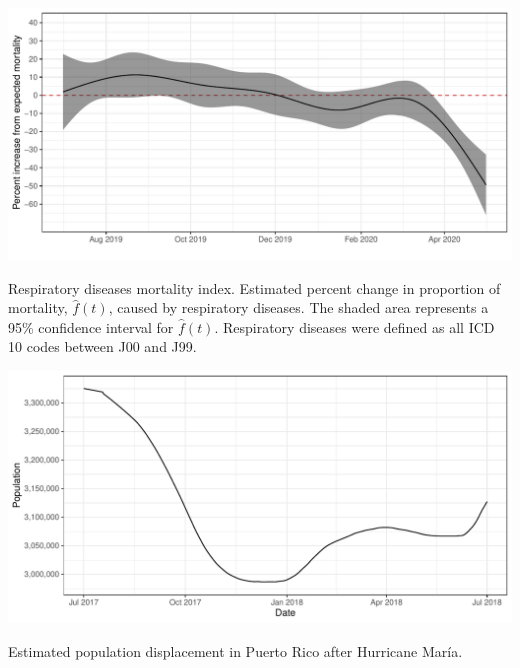 \documentclass[11pt]{article}
\begin{document}
\begin{suppfigure}[ht]
	\centering
	\includegraphics[width=1\linewidth]{figs/supp-figure-6.pdf} 
	\caption{Respiratory diseases mortality index. Estimated percent change in proportion of mortality, $\hat{f}(t)$, caused by respiratory diseases. The shaded area represents a 95\% confidence interval for $\hat{f}(t)$. Respiratory diseases were defined as all ICD 10 codes between J00 and J99.}
	\label{supp-fig:respiratory-index-pr}
\end{suppfigure}

\begin{suppfigure}[ht]
	\centering
	\includegraphics[width=1\linewidth]{figs/supp-figure-7.pdf} 
	\caption{Estimated population displacement in Puerto Rico after Hurricane Mar\'ia.}
	\label{supp-fig:pop-displacement-pr}
\end{suppfigure}
\end{document}
